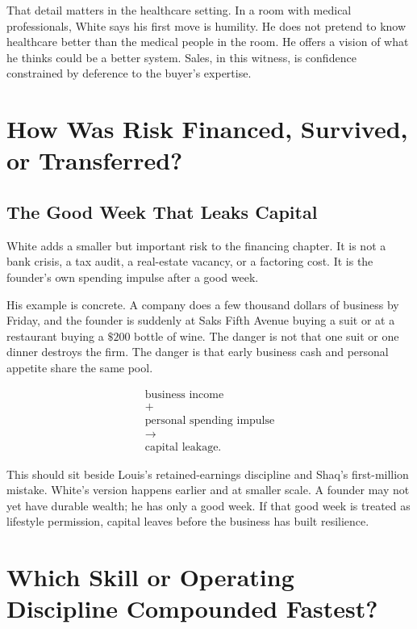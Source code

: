 \documentclass[11pt,oneside]{book}
\begin{document}
That detail matters in the healthcare setting. In a room with medical professionals, White says his first move is humility. He does not pretend to know healthcare better than the medical people in the room. He offers a vision of what he thinks could be a better system. Sales, in this witness, is confidence constrained by deference to the buyer's expertise.

\chapter{How Was Risk Financed, Survived, or Transferred?}

\section{The Good Week That Leaks Capital}

White adds a smaller but important risk to the financing chapter. It is not a bank crisis, a tax audit, a real-estate vacancy, or a factoring cost. It is the founder's own spending impulse after a good week.

His example is concrete. A company does a few thousand dollars of business by Friday, and the founder is suddenly at Saks Fifth Avenue buying a suit or at a restaurant buying a \(\$200\) bottle of wine. The danger is not that one suit or one dinner destroys the firm. The danger is that early business cash and personal appetite share the same pool.

\begin{equation}
\begin{gathered}
\text{business income}\\
+\\
\text{personal spending impulse}\\
\longrightarrow\\
\text{capital leakage}.
\end{gathered}
\end{equation}

This should sit beside Louis's retained-earnings discipline and Shaq's first-million mistake. White's version happens earlier and at smaller scale. A founder may not yet have durable wealth; he has only a good week. If that good week is treated as lifestyle permission, capital leaves before the business has built resilience.

\chapter{Which Skill or Operating Discipline Compounded Fastest?}
\end{document}
